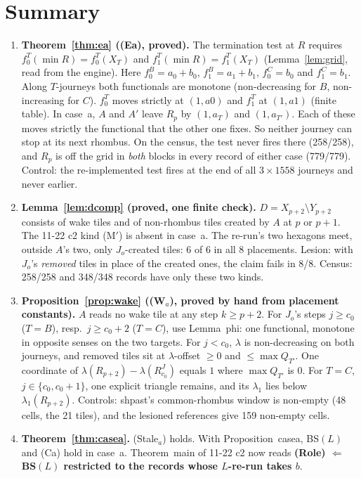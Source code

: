 \documentclass[11pt]{article}
\theoremstyle{definition}\newtheorem{definition}[theorem]{Definition}\newtheorem{remark}[theorem]{Remark}
\begin{document}
\section*{Summary}
\begin{enumerate}
\item \textbf{Theorem~\ref{thm:ea} ((Ea), proved).} The termination test at $R$ requires $f_0^T(\min R)=f_0^T(X_T)$ and $f_1^T(\min R)=f_1^T(X_T)$ (Lemma~\ref{lem:grid}, read from the engine). Here $f_0^B=a_0+b_0$, $f_1^B=a_1+b_1$, $f_0^C=b_0$ and $f_1^C=b_1$. Along $T$-journeys both functionals are monotone (non-decreasing for $B$, non-increasing for $C$). $f_0^T$ moves strictly at $(1,a0)$ and $f_1^T$ at $(1,a1)$ (finite table). In case~a, $A$ and $A'$ leave $R_p$ by $(1,a_T)$ and $(1,a_{T'})$. Each of these moves strictly the functional that the other one fixes. So neither journey can stop at its next rhombus. On the census, the test never fires there (258/258), and $R_p$ is off the grid in \emph{both} blocks in every record of either case (779/779). Control: the re-implemented test fires at the end of all $3\times1558$ journeys and never earlier.
\item \textbf{Lemma~\ref{lem:dcomp} (proved, one finite check).} $D=X_{p+2}\setminus Y_{p+2}$ consists of wake tiles and of non-rhombus tiles created by $A$ at $p$ or $p+1$. The 11-22 c2 kind (M$'$) is absent in case~a. The re-run's two hexagons meet, outside $A$'s two, only $J_o$-created tiles: 6 of 6 in all 8 placements. Lesion: with $J_o$'s \emph{removed} tiles in place of the created ones, the claim fails in 8/8. Census: 258/258 and 348/348 records have only these two kinds.
\item \textbf{Proposition~\ref{prop:wake} ((W$_a$), proved by hand from placement constants).} $A$ reads no wake tile at any step $k\ge p+2$. For $J_o$'s steps $j\ge c_0$ ($T=B$), resp.\ $j\ge c_0+2$ ($T=C$), use Lemma~phi: one functional, monotone in opposite senses on the two targets. For $j<c_0$, $\lambda$ is non-decreasing on both journeys, and removed tiles sit at $\lambda$-offset $\ge0$ and $\le\max Q_{T'}$. One coordinate of $\lambda(R_{p+2})-\lambda(R^J_{c_0})$ equals $1$ where $\max Q_{T'}$ is $0$. For $T=C$, $j\in\{c_0,c_0+1\}$, one explicit triangle remains, and its $\lambda_1$ lies below $\lambda_1(R_{p+2})$. Controls: shpast's common-rhombus window is non-empty (48 cells, the 21 tiles), and the lesioned references give 159 non-empty cells.
\item \textbf{Theorem~\ref{thm:casea}.} (Stale$_a$) holds. With Proposition~casea, BS$(L)$ and (Ca) hold in case~a. Theorem~main of 11-22 c2 now reads \textbf{(Role) $\Leftarrow$ BS$(L)$ restricted to the records whose $L$-re-run takes $b$}.

\end{enumerate}
\end{document}
